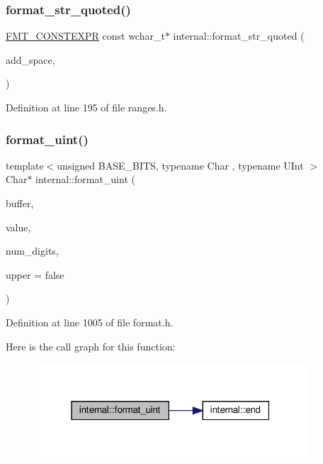 \subsubsection{\texorpdfstring{format\+\_\+str\+\_\+quoted()}{format\_str\_quoted()}\hspace{0.1cm}{\footnotesize\ttfamily [6/6]}}
{\footnotesize\ttfamily \hyperlink{core_8h_a69201cb276383873487bf68b4ef8b4cd}{F\+M\+T\+\_\+\+C\+O\+N\+S\+T\+E\+X\+PR} const wchar\+\_\+t$\ast$ internal\+::format\+\_\+str\+\_\+quoted (\begin{DoxyParamCaption}\item[{bool}]{add\+\_\+space,  }\item[{const wchar\+\_\+t}]{ }\end{DoxyParamCaption})}



Definition at line 195 of file ranges.\+h.

\mbox{\label{namespaceinternal_a4308052bc51067b992e122ace6fd606c}} 
\subsubsection{\texorpdfstring{format\+\_\+uint()}{format\_uint()}\hspace{0.1cm}{\footnotesize\ttfamily [1/2]}}
{\footnotesize\ttfamily template$<$unsigned B\+A\+S\+E\+\_\+\+B\+I\+TS, typename Char , typename U\+Int $>$ \\
Char$\ast$ internal\+::format\+\_\+uint (\begin{DoxyParamCaption}\item[{Char $\ast$}]{buffer,  }\item[{U\+Int}]{value,  }\item[{int}]{num\+\_\+digits,  }\item[{bool}]{upper = {\ttfamily false} }\end{DoxyParamCaption})\hspace{0.3cm}{\ttfamily [inline]}}



Definition at line 1005 of file format.\+h.

Here is the call graph for this function\+:
\nopagebreak
\begin{figure}[H]
\begin{center}
\leavevmode
\includegraphics[width=289pt]{namespaceinternal_a4308052bc51067b992e122ace6fd606c_cgraph}
\end{center}
\end{figure}
\mbox{\label{namespaceinternal_a0082ec32cbe6bacb75040266def77648}} 
